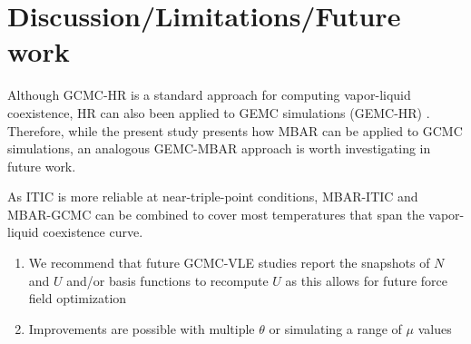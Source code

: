 \documentclass[journal=jced,manuscript=article]{achemso}
\begin{document}

\section{Discussion/Limitations/Future work} \label{sec: Discussion}

Although GCMC-HR is a standard approach for computing vapor-liquid coexistence, HR can also been applied to GEMC simulations (GEMC-HR) \cite{Boulougouris2010}. Therefore, while the present study presents how MBAR can be applied to GCMC simulations, an analogous GEMC-MBAR approach is worth investigating in future work.

As ITIC is more reliable at near-triple-point conditions, MBAR-ITIC and MBAR-GCMC can be combined to cover most temperatures that span the vapor-liquid coexistence curve.

\begin{enumerate}
	\item We recommend that future GCMC-VLE studies report the snapshots of $N$ and $U$ and/or basis functions to recompute $U$ as this allows for future force field optimization
	\item Improvements are possible with multiple $\theta$ or simulating a range of $\mu$ values
\end{enumerate}
\end{document}
